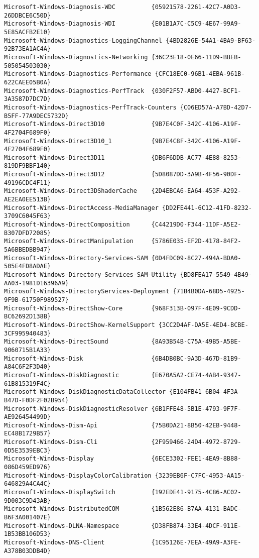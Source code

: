 \documentclass{report}
\begin{document}
\begin{lstlisting}[breaklines=true,basicstyle=\tiny]
Microsoft-Windows-Diagnosis-WDC          {05921578-2261-42C7-A0D3-26DDBCE6C50D}
Microsoft-Windows-Diagnosis-WDI          {E01B1A7C-C5C9-4E67-99A9-5E85ACFB2E10}
Microsoft-Windows-Diagnostics-LoggingChannel {4BD2826E-54A1-4BA9-BF63-92B73EA1AC4A}
Microsoft-Windows-Diagnostics-Networking {36C23E18-0E66-11D9-BBEB-505054503030}
Microsoft-Windows-Diagnostics-Performance {CFC18EC0-96B1-4EBA-961B-622CAEE05B0A}
Microsoft-Windows-Diagnostics-PerfTrack  {030F2F57-ABD0-4427-BCF1-3A3587D7DC7D}
Microsoft-Windows-Diagnostics-PerfTrack-Counters {C06ED57A-A7BD-42D7-B5FF-77A9DEC5732D}
Microsoft-Windows-Direct3D10             {9B7E4C0F-342C-4106-A19F-4F2704F689F0}
Microsoft-Windows-Direct3D10_1           {9B7E4C8F-342C-4106-A19F-4F2704F689F0}
Microsoft-Windows-Direct3D11             {DB6F6DDB-AC77-4E88-8253-819DF9BBF140}
Microsoft-Windows-Direct3D12             {5D8087DD-3A9B-4F56-90DF-49196CDC4F11}
Microsoft-Windows-Direct3DShaderCache    {2D4EBCA6-EA64-453F-A292-AE2EA0EE513B}
Microsoft-Windows-DirectAccess-MediaManager {DD2FE441-6C12-41FD-8232-3709C6045F63}
Microsoft-Windows-DirectComposition      {C44219D0-F344-11DF-A5E2-B307DFD72085}
Microsoft-Windows-DirectManipulation     {5786E035-EF2D-4178-84F2-5A6BBEDBB947}
Microsoft-Windows-Directory-Services-SAM {0D4FDC09-8C27-494A-BDA0-505E4FD8ADAE}
Microsoft-Windows-Directory-Services-SAM-Utility {BD8FEA17-5549-4B49-AA03-1981D16396A9}
Microsoft-Windows-DirectoryServices-Deployment {71B4B0DA-68D5-4925-9F9B-61750F989527}
Microsoft-Windows-DirectShow-Core        {968F313B-097F-4E09-9CDD-BC62692D138B}
Microsoft-Windows-DirectShow-KernelSupport {3CC2D4AF-DA5E-4ED4-BCBE-3CF995940483}
Microsoft-Windows-DirectSound            {8A93B54B-C75A-49B5-A5BE-9060715B1A33}
Microsoft-Windows-Disk                   {6B4DB0BC-9A3D-467D-81B9-A84C6F2F3D40}
Microsoft-Windows-DiskDiagnostic         {E670A5A2-CE74-4AB4-9347-61B815319F4C}
Microsoft-Windows-DiskDiagnosticDataCollector {E104FB41-6B04-4F3A-B47D-F0DF2F02B954}
Microsoft-Windows-DiskDiagnosticResolver {6B1FFE48-5B1E-4793-9F7F-AE926454499D}
Microsoft-Windows-Dism-Api               {75B0DA21-8B50-42EB-9448-EC48B1729B57}
Microsoft-Windows-Dism-Cli               {2F959466-24D4-4972-8729-0D5E3539EBC3}
Microsoft-Windows-Display                {6ECE3302-FEE1-4EA9-8B88-086D459ED976}
Microsoft-Windows-DisplayColorCalibration {3239EB6F-C7FC-4953-AA15-646829A4CA4C}
Microsoft-Windows-DisplaySwitch          {192EDE41-9175-4C86-AC02-9D003C9D43AB}
Microsoft-Windows-DistributedCOM         {1B562E86-B7AA-4131-BADC-B6F3A001407E}
Microsoft-Windows-DLNA-Namespace         {D38FB874-33E4-4DCF-911E-1B53BB106D53}
Microsoft-Windows-DNS-Client             {1C95126E-7EEA-49A9-A3FE-A378B03DDB4D}

\end{lstlisting}
\end{document}

